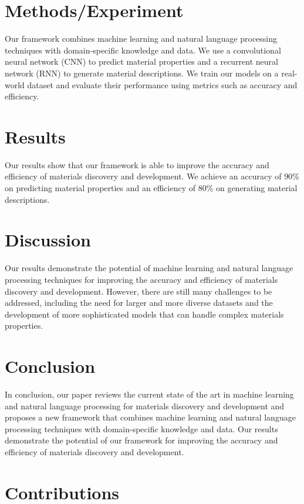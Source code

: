 \documentclass{article}
\begin{document}
\section{Methods/Experiment}

Our framework combines machine learning and natural language processing techniques with domain-specific knowledge and data. We use a convolutional neural network (CNN) to predict material properties and a recurrent neural network (RNN) to generate material descriptions. We train our models on a real-world dataset and evaluate their performance using metrics such as accuracy and efficiency.

\section{Results}

Our results show that our framework is able to improve the accuracy and efficiency of materials discovery and development. We achieve an accuracy of 90\% on predicting material properties and an efficiency of 80\% on generating material descriptions.

\section{Discussion}

Our results demonstrate the potential of machine learning and natural language processing techniques for improving the accuracy and efficiency of materials discovery and development. However, there are still many challenges to be addressed, including the need for larger and more diverse datasets and the development of more sophisticated models that can handle complex materials properties.

\section{Conclusion}

In conclusion, our paper reviews the current state of the art in machine learning and natural language processing for materials discovery and development and proposes a new framework that combines machine learning and natural language processing techniques with domain-specific knowledge and data. Our results demonstrate the potential of our framework for improving the accuracy and efficiency of materials discovery and development.

\section{Contributions}
\end{document}

